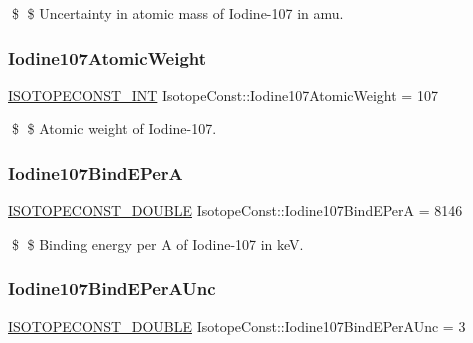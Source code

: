 \$ \$ Uncertainty in atomic mass of Iodine-\/107 in amu. \mbox{\label{group___isotope_const-_iodine-_i107_gaee238e566455549028402dc5c253e641}} 
\subsubsection{\texorpdfstring{Iodine107\+Atomic\+Weight}{Iodine107AtomicWeight}}
{\footnotesize\ttfamily \mbox{\hyperlink{group___isotope_const-_macros_ga5f18360b3e99483a35c32d789e62621c}{I\+S\+O\+T\+O\+P\+E\+C\+O\+N\+S\+T\+\_\+\+I\+NT}} Isotope\+Const\+::\+Iodine107\+Atomic\+Weight = 107}

\$ \$ Atomic weight of Iodine-\/107. \mbox{\label{group___isotope_const-_iodine-_i107_gacec71fc6a15be0e9b30db7d3270767cf}} 
\subsubsection{\texorpdfstring{Iodine107\+Bind\+E\+PerA}{Iodine107BindEPerA}}
{\footnotesize\ttfamily \mbox{\hyperlink{group___isotope_const-_macros_ga8f45a7272ce02c0b4c65c44636ed719a}{I\+S\+O\+T\+O\+P\+E\+C\+O\+N\+S\+T\+\_\+\+D\+O\+U\+B\+LE}} Isotope\+Const\+::\+Iodine107\+Bind\+E\+PerA = 8146}

\$ \$ Binding energy per A of Iodine-\/107 in keV. \mbox{\label{group___isotope_const-_iodine-_i107_ga5a717ceeec7890f6b028056ca188c87a}} 
\subsubsection{\texorpdfstring{Iodine107\+Bind\+E\+Per\+A\+Unc}{Iodine107BindEPerAUnc}}
{\footnotesize\ttfamily \mbox{\hyperlink{group___isotope_const-_macros_ga8f45a7272ce02c0b4c65c44636ed719a}{I\+S\+O\+T\+O\+P\+E\+C\+O\+N\+S\+T\+\_\+\+D\+O\+U\+B\+LE}} Isotope\+Const\+::\+Iodine107\+Bind\+E\+Per\+A\+Unc = 3}

